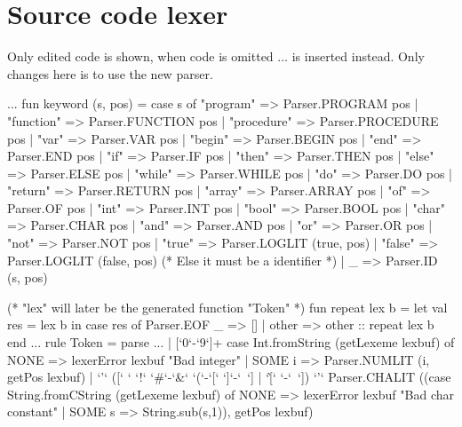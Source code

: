 \documentclass[10pt]{article}
\begin{document}
\section{Source code lexer}
Only edited code is shown, when code is omitted $\ldots$ is inserted instead. Only changes here is to use the new parser.
\begin{fancycode}[frame=lines,fontsize=\scriptsize,label=\textit{edited code - SRC/Lexer.lex - }]
...
fun keyword (s, pos) =
     case s of
         "program"      => Parser.PROGRAM    pos
       | "function"     => Parser.FUNCTION   pos
       | "procedure"    => Parser.PROCEDURE  pos
       | "var"          => Parser.VAR        pos
       | "begin"        => Parser.BEGIN      pos
       | "end"          => Parser.END        pos
       | "if"           => Parser.IF         pos
       | "then"         => Parser.THEN       pos
       | "else"         => Parser.ELSE       pos
       | "while"        => Parser.WHILE      pos
       | "do"           => Parser.DO         pos
       | "return"       => Parser.RETURN     pos
       | "array"        => Parser.ARRAY      pos
       | "of"           => Parser.OF         pos
       | "int"          => Parser.INT        pos
       | "bool"         => Parser.BOOL       pos
       | "char"         => Parser.CHAR       pos
       | "and"          => Parser.AND        pos
       | "or"           => Parser.OR         pos
       | "not"          => Parser.NOT        pos
       | "true"         => Parser.LOGLIT     (true, pos)
       | "false"        => Parser.LOGLIT     (false, pos)
       (* Else it must be a identifier *)
       | _              => Parser.ID         (s, pos)

   (* "lex" will later be the generated function "Token" *)
   fun repeat lex b
              = let val res = lex b
                in case res of
                         Parser.EOF _ => []
                       | other => other :: repeat lex b
                end
...
rule Token = parse
...
  | [`0`-`9`]+          { case Int.fromString (getLexeme lexbuf) of
                               NONE   => lexerError lexbuf "Bad integer"
                             | SOME i => Parser.NUMLIT (i, getPos lexbuf) }
  | `'` ([` ` `!` `#`-`&` `(`-`[` `]`-`~`] | `\`[` `-`~`]) `'`
                        { Parser.CHALIT
                            ((case String.fromCString (getLexeme lexbuf) of
                               NONE => lexerError lexbuf "Bad char constant"
                             | SOME s => String.sub(s,1)),
                             getPos lexbuf) }


\end{fancycode}
\end{document}
